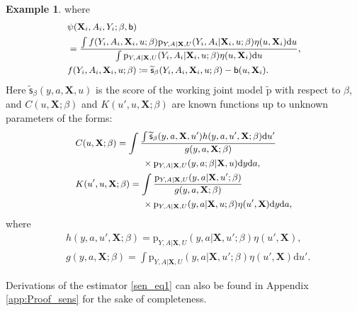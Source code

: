 \documentclass{article}
\def\sfb{\mathsf{b}}
\def\sfb{\mathsf{b}}
\def\bfX{\mathbf{X}}
\def\sfs{\mathsf{s}}
\theoremstyle{plain}
\theoremstyle{definition}
\newtheorem{example}[theorem]{Example}
\theoremstyle{remark}
\def\diff{\mathrm{d}}
\def\tilde{\widetilde}
\def\p{\mathrm{p}}
\begin{document}
\begin{example}
where
\begin{equation*}
\small
\begin{aligned}
& \psi (\bfX_{i}, A_{i}, Y_{i}; \beta,\sfb) \\
& = \frac{\int f(Y_i,A_i,\bfX_i,u;\beta) \p_{Y, A | \bfX, U} (Y_{i}, A_{i}| \bfX_{i}, u; \beta) \eta (u, \bfX_{i}) \diff u}{\int \p_{Y, A | \bfX, U} (Y_{i}, A_{i}| \bfX_{i}, u; \beta) \eta (u, \bfX_{i}) \diff u}, \\
&  f (Y_i,A_i,\bfX_i,u;\beta) \coloneqq \tilde{\sfs}_{\beta} (Y_{i}, A_{i}, \bfX_{i}, u;\beta) - \mathsf{b} (u, \bfX_{i}).
\end{aligned}
\end{equation*}
Here $\tilde{\sfs}_{\beta} (y, a, \bfX, u)$ is the score of the working joint model $\tilde{\p}$ with respect to $\beta$, and $C (u, \bfX; \beta)$ and $K (u', u, \bfX; \beta)$ are known functions up to unknown parameters of the forms:
\begin{equation*}
\small
\begin{split}
& C (u, \bfX;\beta)  =  \int \frac{\int \tilde{\sfs}_{\beta} (y, a, \bfX, u') h (y, a, u', \bfX; \beta) \diff u'}{g(y, a, \bfX;\beta)} \\
& \quad \quad \quad \quad \quad \quad \quad \ \times \p_{Y, A | \bfX, U} (y, a;\beta | \bfX, u) \diff y \diff a ,\\
& K (u', u, \bfX;\beta)  = \int \frac{\p_{Y, A | \bfX, U} (y, a | \bfX, u'; \beta) }{g (y, a, \bfX;\beta)} \\
& \quad \quad \quad \quad \quad \quad \quad \ \times \p_{Y, A | \bfX, U} (y, a | \bfX, u; \beta) \eta (u', \bfX) \diff y \diff a,
\end{split}
\end{equation*}
where
\begin{equation*}
\begin{split}
& h (y, a, u', \bfX;\beta)  = \p_{Y, A | \bfX, U} (y, a| \bfX, u'; \beta) \eta (u', \bfX), \\
& g(y, a, \bfX;\beta)  = \int \p_{Y, A | \bfX, U} (y, a | \bfX, u'; \beta) \eta (u', \bfX) \diff u'.
\end{split}
\end{equation*}

Derivations of the estimator \eqref{sen_eq1} can also be found in Appendix \ref{app:Proof_sens} for the sake of completeness.
\label{eg:sensitivity}
\end{example}
\end{document}
